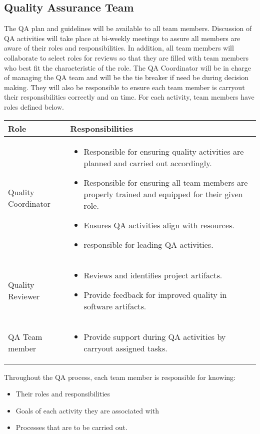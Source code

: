 \documentclass[a3paper, 11pt]{article}
\newcommand\tab[1][1cm]{\hspace*{#1}}
\begin{document}
\subsection{Quality Assurance Team}
The QA plan and guidelines will be available to all team members. Discussion of QA activities will take place at bi-weekly meetings to assure all members are aware of their roles and responsibilities. In addition, all team members will collaborate to select roles for reviews so that they are filled with team members who best fit the characteristic of the role.
\tab The QA Coordinator will be in charge of managing the QA team and will be the tie breaker if need be during decision making. They will also be responsible to ensure each team member is carryout their responsibilities correctly and on time. For each activity, team members have roles defined below.
\begin{center}
	\begin{tabular}{|p{4cm}|p{11.4cm}|}
		\hline
		\textbf{Role}& \textbf{Responsibilities} \\ \hline
		Quality Coordinator &
		\begin{itemize}
			\item Responsible for ensuring quality activities are planned and carried out accordingly.
			\item Responsible for ensuring all team members are properly trained and equipped for their given role. 
			\item Ensures QA activities align with resources. 
			\item responsible for leading QA activities.
		\end{itemize}  \\ \hline
		Quality Reviewer & 
		\begin{itemize}
			\item Reviews and identifies project artifacts. 
			\item Provide feedback for improved quality in software artifacts. 
		\end{itemize}	\\ \hline
		QA Team member & 
		\begin{itemize}
			\item Provide support during QA activities by carryout assigned tasks.
		\end{itemize} \\ \hline
	\end{tabular}
\end{center}
Throughout the QA process, each team member is responsible for knowing:
\begin{itemize}
	\item Their roles and responsibilities
	\item Goals of each activity they are associated with
	\item Processes that are to be carried out. 
\end{itemize}
\end{document}
